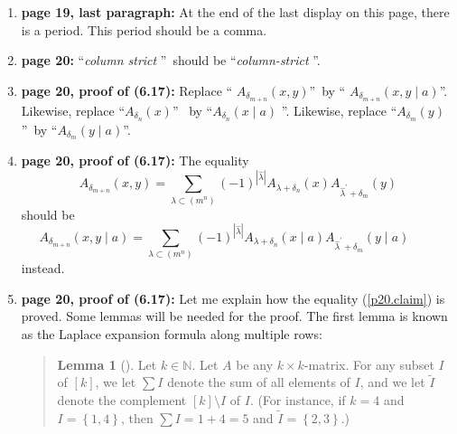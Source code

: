 \documentclass[numbers=enddot,12pt,final,onecolumn,notitlepage]{scrartcl}%
\newenvironment{statement}{\begin{quote}}{\end{quote}}
\theoremstyle{definition}
\newtheorem{lem}[theo]{Lemma}
\newenvironment{lemmain}[1][]
{\begin{statement}\begin{lem}[#1]}
{\end{lem}\end{statement}}
\newenvironment{lemmain}[1][Proof]{\noindent\textbf{#1.} }{\ \rule{0.5em}{0.5em}}
\let\sumnonlimits\sum
\renewcommand{\sum}{\sumnonlimits\limits}
\begin{document}
\begin{enumerate}
\item \textbf{page 19, last paragraph:} At the end of the last display on this
page, there is a period. This period should be a comma.

\item \textbf{page 20:} \textquotedblleft\textit{column strict}%
\textquotedblright\ should be \textquotedblleft\textit{column-strict}%
\textquotedblright.

\item \textbf{page 20, proof of (6.17):} Replace \textquotedblleft%
$A_{\delta_{m+n}}\left(  x,y\right)  $\textquotedblright\ by \textquotedblleft%
$A_{\delta_{m+n}}\left(  x,y\mid a\right)  $\textquotedblright. Likewise,
replace \textquotedblleft$A_{\delta_{n}}\left(  x\right)  $\textquotedblright%
\ by \textquotedblleft$A_{\delta_{n}}\left(  x\mid a\right)  $%
\textquotedblright. Likewise, replace \textquotedblleft$A_{\delta_{m}}\left(
y\right)  $\textquotedblright\ by \textquotedblleft$A_{\delta_{m}}\left(
y\mid a\right)  $\textquotedblright.

\item \textbf{page 20, proof of (6.17):} The equality%
\[
A_{\delta_{m+n}}\left(  x,y\right)  =\sum_{\lambda\subset\left(  m^{n}\right)
}\left(  -1\right)  ^{\left\vert \widehat{\lambda}\right\vert }A_{\lambda
+\delta_{n}}\left(  x\right)  A_{\widehat{\lambda}^{\prime}+\delta_{m}}\left(
y\right)
\]
should be
\begin{equation}
A_{\delta_{m+n}}\left(  x,y\mid a\right)  =\sum_{\lambda\subset\left(
m^{n}\right)  }\left(  -1\right)  ^{\left\vert \widehat{\lambda}\right\vert
}A_{\lambda+\delta_{n}}\left(  x\mid a\right)  A_{\widehat{\lambda}^{\prime
}+\delta_{m}}\left(  y\mid a\right)  \ \ \ \ \ \ \ \ \ \ \label{p20.claim}%
\end{equation}
instead.

\item \textbf{page 20, proof of (6.17):} Let me explain how the equality
(\ref{p20.claim}) is proved. Some lemmas will be needed for the proof. The
first lemma is known as the Laplace expansion formula along multiple rows:

\begin{lemmain}
\label{lem.lap-rows}Let $k\in\mathbb{N}$. Let $A$ be any $k\times k$-matrix.
For any subset $I$ of $\left[  k\right]  $, we let $\sum I$ denote the sum of
all elements of $I$, and we let $\widetilde{I}$ denote the complement $\left[
k\right]  \setminus I$ of $I$. (For instance, if $k=4$ and $I=\left\{
1,4\right\}  $, then $\sum I=1+4=5$ and $\widetilde{I}=\left\{  2,3\right\}  $.)


\end{lemmain}
\end{enumerate}
\end{document}
